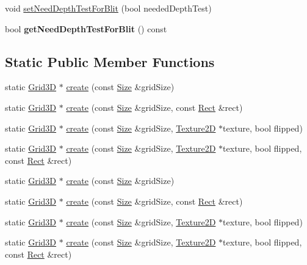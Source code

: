 \textbf{ }\par
\begin{DoxyCompactItemize}
\item 
void \hyperlink{classGrid3D_a6d2d00afb35013a206d85b5cd298f781}{set\+Need\+Depth\+Test\+For\+Blit} (bool needed\+Depth\+Test)
\item 
\mbox{\label{classGrid3D_a61c1776c49df54cc275acb01f925fdce}} 
bool {\bfseries get\+Need\+Depth\+Test\+For\+Blit} () const
\end{DoxyCompactItemize}

\subsection*{Static Public Member Functions}
\begin{DoxyCompactItemize}
\item 
static \hyperlink{classGrid3D}{Grid3D} $\ast$ \hyperlink{classGrid3D_aba8b93f0b719addc229413358ea59d56}{create} (const \hyperlink{classSize}{Size} \&grid\+Size)
\item 
static \hyperlink{classGrid3D}{Grid3D} $\ast$ \hyperlink{classGrid3D_ad21f7a65ec26387d56385194510b47cb}{create} (const \hyperlink{classSize}{Size} \&grid\+Size, const \hyperlink{classRect}{Rect} \&rect)
\item 
static \hyperlink{classGrid3D}{Grid3D} $\ast$ \hyperlink{classGrid3D_a509ede1d9d837c1f6a7b304809944649}{create} (const \hyperlink{classSize}{Size} \&grid\+Size, \hyperlink{classTexture2D}{Texture2D} $\ast$texture, bool flipped)
\item 
static \hyperlink{classGrid3D}{Grid3D} $\ast$ \hyperlink{classGrid3D_a1204eaea469d9cafd34f76acf0504a16}{create} (const \hyperlink{classSize}{Size} \&grid\+Size, \hyperlink{classTexture2D}{Texture2D} $\ast$texture, bool flipped, const \hyperlink{classRect}{Rect} \&rect)
\item 
static \hyperlink{classGrid3D}{Grid3D} $\ast$ \hyperlink{classGrid3D_a5d3460877c9ea325ae3646e6a6684e66}{create} (const \hyperlink{classSize}{Size} \&grid\+Size)
\item 
static \hyperlink{classGrid3D}{Grid3D} $\ast$ \hyperlink{classGrid3D_afca4a306149283f050daf6a1bd29ec95}{create} (const \hyperlink{classSize}{Size} \&grid\+Size, const \hyperlink{classRect}{Rect} \&rect)
\item 
static \hyperlink{classGrid3D}{Grid3D} $\ast$ \hyperlink{classGrid3D_a555f0b6973f70a969a43b2bfa5ff1900}{create} (const \hyperlink{classSize}{Size} \&grid\+Size, \hyperlink{classTexture2D}{Texture2D} $\ast$texture, bool flipped)
\item 
static \hyperlink{classGrid3D}{Grid3D} $\ast$ \hyperlink{classGrid3D_a619f4692c902a986dedbe01b75a71df0}{create} (const \hyperlink{classSize}{Size} \&grid\+Size, \hyperlink{classTexture2D}{Texture2D} $\ast$texture, bool flipped, const \hyperlink{classRect}{Rect} \&rect)
\end{DoxyCompactItemize}
